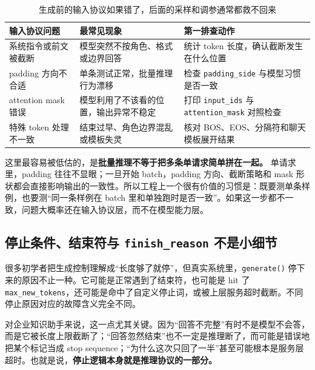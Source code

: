 \begin{table}[H]
\centering
\small
\begin{tabularx}{\textwidth}{>{\raggedright\arraybackslash}p{3cm}>{\raggedright\arraybackslash}p{3.2cm}>{\raggedright\arraybackslash}X}
\toprule
\textbf{输入协议问题} & \textbf{最常见现象} & \textbf{第一排查动作} \\
\midrule
系统指令或前文被截断 & 模型突然不按角色、格式或边界回答 & 统计 token 长度，确认截断发生在什么位置 \\
padding 方向不合适 & 单条测试正常，批量推理行为漂移 & 检查 \texttt{padding\_side} 与模型习惯是否一致 \\
attention mask 错误 & 模型利用了不该看的位置，输出异常不稳定 & 打印 \texttt{input\_ids} 与 \texttt{attention\_mask} 对照检查 \\
特殊 token 处理不一致 & 结束过早、角色边界混乱或模板失灵 & 核对 BOS、EOS、分隔符和聊天模板展开结果 \\
\bottomrule
\end{tabularx}
\caption{生成前的输入协议如果错了，后面的采样和调参通常都救不回来}
\label{tab:input-protocol-failures}
\end{table}

这里最容易被低估的，是\textbf{批量推理不等于把多条单请求简单拼在一起。} 单请求里，padding 往往不显眼；一旦开始 batch，padding 方向、截断策略和 mask 形状都会直接影响输出的一致性。所以工程上一个很有价值的习惯是：既要测单条样例，也要测“同一条样例在 batch 里和单独跑时是否一致”。如果这一步都不一致，问题大概率还在输入协议层，而不在模型能力层。

\subsection{停止条件、结束符与 \texttt{finish\_reason} 不是小细节}
很多初学者把生成控制理解成“长度够了就停”，但真实系统里，\texttt{generate()} 停下来的原因不止一种。它可能是正常遇到了结束符，也可能是 hit 了 \texttt{max\_new\_tokens}，还可能是命中了自定义停止词，或被上层服务超时截断。不同停止原因对应的故障含义完全不同。

对企业知识助手来说，这一点尤其关键。因为“回答不完整”有时不是模型不会答，而是它被长度上限截断了；“回答忽然结束”也不一定是推理断了，而可能是错误地把某个标记当成 stop sequence；“为什么这次只回了一半”甚至可能根本是服务层超时。也就是说，\textbf{停止逻辑本身就是推理协议的一部分。}


